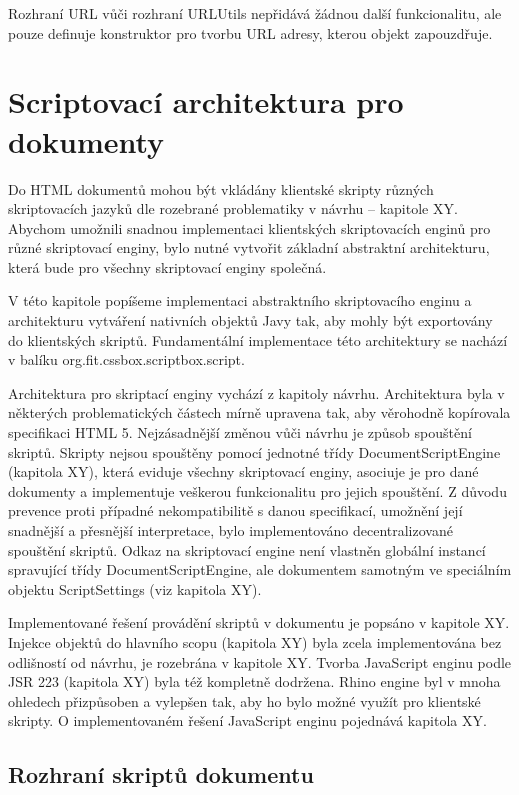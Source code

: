 Rozhraní URL vůči rozhraní URLUtils nepřidává žádnou další funkcionalitu, ale pouze definuje konstruktor pro tvorbu URL adresy, kterou objekt zapouzdřuje.

\section{Scriptovací architektura pro dokumenty}
\label{Chapter.Implementation.ScriptingArchitecture}

Do HTML dokumentů mohou být vkládány klientské skripty různých skriptovacích jazyků dle rozebrané problematiky v návrhu -- kapitole XY. Abychom umožnili snadnou implementaci klientských skriptovacích enginů pro různé skriptovací enginy, bylo nutné vytvořit základní abstraktní architekturu, která bude pro všechny skriptovací enginy společná. 

V této kapitole popíšeme implementaci abstraktního skriptovacího enginu a architekturu vytváření nativních objektů Javy tak, aby mohly být exportovány do klientských skriptů. Fundamentální implementace této architektury se nachází v balíku org.fit.cssbox.scriptbox.script. 

Architektura pro skriptací enginy vychází z kapitoly návrhu. Architektura byla v některých problematických částech mírně upravena tak, aby věrohodně kopírovala specifikaci HTML 5. Nejzásadnější změnou vůči návrhu je způsob spouštění skriptů. Skripty nejsou spouštěny pomocí jednotné třídy DocumentScriptEngine (kapitola XY), která eviduje všechny skriptovací enginy, asociuje je pro dané dokumenty a implementuje veškerou funkcionalitu pro jejich spouštění. Z důvodu prevence proti případné nekompatibilitě s danou specifikací, umožnění její snadnější a přesnější interpretace, bylo implementováno decentralizované spouštění skriptů. Odkaz na skriptovací engine není vlastněn globální instancí spravující třídy DocumentScriptEngine, ale dokumentem samotným ve speciálním objektu ScriptSettings (viz kapitola XY).

Implementované řešení provádění skriptů v dokumentu je popsáno v kapitole XY. Injekce objektů do hlavního scopu (kapitola XY) byla zcela implementována bez odlišností od návrhu, je rozebrána v kapitole XY. Tvorba JavaScript enginu podle JSR 223 (kapitola XY) byla též kompletně dodržena. Rhino engine byl v mnoha ohledech přizpůsoben a vylepšen tak, aby ho bylo možné využít pro klientské skripty. O implementovaném řešení JavaScript enginu pojednává kapitola XY.

\subsection{Rozhraní skriptů dokumentu}
\label{Chapter.Implementation.ScriptInterface}

